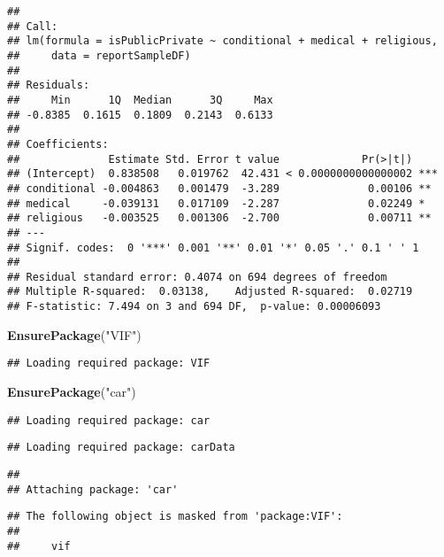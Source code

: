 \documentclass[]{article}
\newenvironment{Shaded}{\begin{snugshade}}{\end{snugshade}}
\newcommand{\KeywordTok}[1]{\textcolor[rgb]{0.13,0.29,0.53}{\textbf{#1}}}
\newcommand{\NormalTok}[1]{#1}
\newcommand{\StringTok}[1]{\textcolor[rgb]{0.31,0.60,0.02}{#1}}
\begin{document}
\begin{verbatim}
## 
## Call:
## lm(formula = isPublicPrivate ~ conditional + medical + religious, 
##     data = reportSampleDF)
## 
## Residuals:
##     Min      1Q  Median      3Q     Max 
## -0.8385  0.1615  0.1809  0.2143  0.6133 
## 
## Coefficients:
##              Estimate Std. Error t value             Pr(>|t|)    
## (Intercept)  0.838508   0.019762  42.431 < 0.0000000000000002 ***
## conditional -0.004863   0.001479  -3.289              0.00106 ** 
## medical     -0.039131   0.017109  -2.287              0.02249 *  
## religious   -0.003525   0.001306  -2.700              0.00711 ** 
## ---
## Signif. codes:  0 '***' 0.001 '**' 0.01 '*' 0.05 '.' 0.1 ' ' 1
## 
## Residual standard error: 0.4074 on 694 degrees of freedom
## Multiple R-squared:  0.03138,    Adjusted R-squared:  0.02719 
## F-statistic: 7.494 on 3 and 694 DF,  p-value: 0.00006093
\end{verbatim}

\begin{Shaded}
\begin{Highlighting}[]
\KeywordTok{EnsurePackage}\NormalTok{(}\StringTok{"VIF"}\NormalTok{)}
\end{Highlighting}
\end{Shaded}

\begin{verbatim}
## Loading required package: VIF
\end{verbatim}

\begin{Shaded}
\begin{Highlighting}[]
\KeywordTok{EnsurePackage}\NormalTok{(}\StringTok{"car"}\NormalTok{)}
\end{Highlighting}
\end{Shaded}

\begin{verbatim}
## Loading required package: car
\end{verbatim}

\begin{verbatim}
## Loading required package: carData
\end{verbatim}

\begin{verbatim}
## 
## Attaching package: 'car'
\end{verbatim}

\begin{verbatim}
## The following object is masked from 'package:VIF':
## 
##     vif
\end{verbatim}
\end{document}
